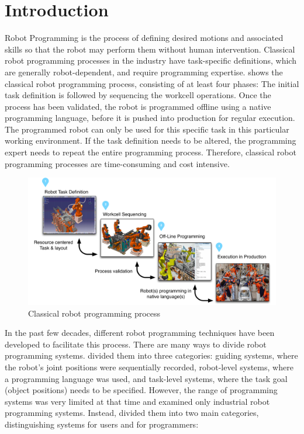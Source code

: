 \section{Introduction}
Robot Programming is the process of defining desired motions and associated skills so that the robot may perform them without human intervention.
Classical robot programming processes in the industry have task-specific definitions, which are generally robot-dependent, and require programming expertise.
 shows the classical robot programming process, consisting of at least four phases:
The initial task definition is followed by sequencing the workcell operations.
Once the process has been validated, the robot is programmed offline using a native programming language, before it is pushed into production for regular execution.
The programmed robot can only be used for this specific task in this particular working environment.
If the task definition needs to be altered, the programming expert needs to repeat the entire programming process.
Therefore, classical robot programming processes are time-consuming and cost intensive.

\begin{figure}[ht]
	\centering
	\includegraphics[width=\linewidth]{figures/manual-programming}
	\caption{Classical robot programming process}
	\label{fig:Classical robot programming process}
\end{figure}

In the past few decades, different robot programming techniques have been developed to facilitate this process. 
There are many ways to divide robot programming systems. 
\cite{lozano1983robot} divided them into three categories: 
guiding systems, where the robot's joint positions were sequentially recorded,
robot-level systems, where a programming language was used, and
task-level systems, where the task goal (\eg object positions) needs to be specified.
However, the range of programming systems was very limited at that time and examined only industrial robot programming systems.
Instead, \cite{Biggs2003} divided them into two main categories, distinguishing systems for users and for programmers:

